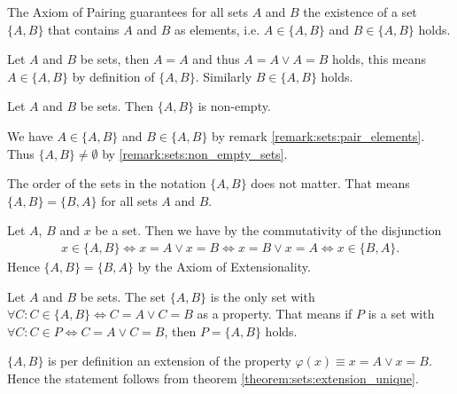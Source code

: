 \begin{remarks}
    \begin{remarkenumerate}
        \item\label{remark:sets:pair_elements} The Axiom of Pairing guarantees for all sets $A$ and $B$ the existence of a set $\{A,B\}$ that contains $A$ and $B$ as elements, i.e. $A\in\{A,B\}$ and $B\in\{A,B\}$ holds.
        \begin{miniproof}
            Let $A$ and $B$ be sets, then $A=A$ and thus $A=A\lor A=B$ holds, this means $A\in\{A,B\}$ by definition of $\{A,B\}$. Similarly $B\in\{A,B\}$ holds.
        \end{miniproof}
        \item\label{remark:sets:pair_non_empty} Let $A$ and $B$ be sets. Then $\{A,B\}$ is non-empty.
        \begin{miniproof}
            We have $A\in\{A,B\}$ and $B\in\{A,B\}$ by remark \ref{remark:sets:pair_elements}. Thus $\{A,B\}\neq\emptyset$ by \ref{remark:sets:non_empty_sets}.
        \end{miniproof}
        \item\label{remark:sets:pair_unordered} The order of the sets in the notation $\{A,B\}$ does not matter. That means $\{A,B\}=\{B,A\}$ for all sets $A$ and $B$.
        \begin{miniproof}
            Let $A$, $B$ and $x$ be a set. Then we have by the commutativity of the disjunction \begin{align}x\in\{A,B\}\Leftrightarrow x=A\lor x=B\Leftrightarrow x=B\lor x=A\Leftrightarrow x\in\{B,A\}.\end{align}
            Hence $\{A,B\}=\{B,A\}$ by the Axiom of Extensionality.
        \end{miniproof}
        \item\label{remark:sets:pair_uniqueness} Let $A$ and $B$ be sets. The set $\{A,B\}$ is the only set with $\forall C\colon C\in\{A,B\}\Leftrightarrow C=A\lor C=B$ as a property. That means if $P$ is a set with $\forall C\colon C\in P\Leftrightarrow C=A\lor C=B$, then $P=\{A,B\}$ holds.
        \begin{miniproof}
            $\{A,B\}$ is per definition an extension of the property $\varphi(x)\equiv x=A\lor x=B$. Hence the statement follows from theorem \ref{theorem:sets:extension_unique}.
        \end{miniproof}
    \end{remarkenumerate}
\end{remarks}

